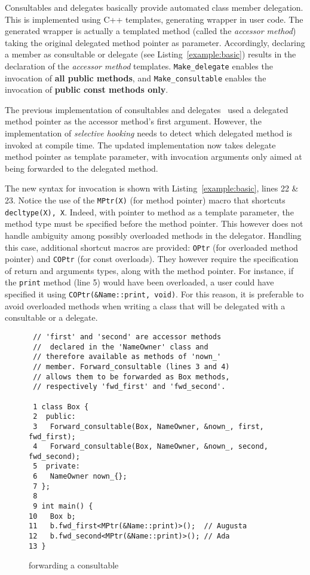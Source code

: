 \documentclass{article}
\begin{document}
Consultables and delegates basically provide automated class member delegation. This is implemented using C++ templates, generating wrapper in user code. The generated wrapper is actually a templated method (called the \textit{accessor method}) taking the original delegated method pointer as parameter. Accordingly, declaring a member as consultable or delegate (see Listing~\ref{example:basic}) results in the declaration of the \textit{accessor method} templates. \texttt{Make\_delegate} enables the invocation of \textbf{all public methods}, and \texttt{Make\_consultable} enables the invocation of \textbf{public const methods only}.     

The previous implementation of consultables and delegates~\cite{2015consultable} used a delegated method pointer as the accessor method's first argument. However, the implementation of \textit{selective hooking} needs to detect which delegated method is invoked at compile time. The updated implementation now takes delegate method pointer as template parameter, with invocation arguments only aimed at being forwarded to the delegated method. 

The new syntax for invocation is shown with Listing~\ref{example:basic}, lines 22 \& 23. Notice the use of the \texttt{MPtr(X)} (for method pointer) macro that shortcuts \texttt{decltype(X), X}. Indeed, with pointer to method as a template parameter, the method type must be specified before the method pointer. This however does not handle ambiguity among possibly overloaded methods in the delegator. Handling this case, additional shortcut macros are provided: \texttt{OPtr} (for overloaded method pointer) and \texttt{COPtr} (for const overloads). They however require the specification of return and arguments types, along with the method pointer. For instance, if the \texttt{print} method (line 5) would have been overloaded, a user could have specified it using \texttt{COPtr(\&Name::print, void)}. For this reason, it is preferable to avoid overloaded methods when writing a class that will be delegated with a consultable or a delegate.  
 
\begin{figure}[ht]
{\small
\begin{lstlisting}
 // 'first' and 'second' are accessor methods
 //  declared in the 'NameOwner' class and 
 // therefore available as methods of 'nown_' 
 // member. Forward_consultable (lines 3 and 4)
 // allows them to be forwarded as Box methods, 
 // respectively 'fwd_first' and 'fwd_second'. 

 1 class Box {
 2  public:
 3   Forward_consultable(Box, NameOwner, &nown_, first, fwd_first);
 4   Forward_consultable(Box, NameOwner, &nown_, second, fwd_second);
 5  private:
 6   NameOwner nown_{};
 7 };
 8 
 9 int main() {
10   Box b;
11   b.fwd_first<MPtr(&Name::print)>();  // Augusta
12   b.fwd_second<MPtr(&Name::print)>(); // Ada
13 }
\end{lstlisting}}
\cprotect\caption{forwarding a consultable}
\label{example:forward}
\end{figure}
\end{document}

